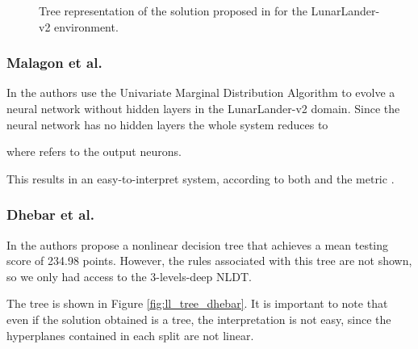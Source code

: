 \documentclass[review,english]{elsarticle}
\begin{document}
\begin{center}
\begin{figure}[!ht]
    \caption{Tree representation of the solution proposed in \cite{silva_optimization_2020} for the LunarLander-v2 environment.}
    \label{fig:ll_tree_silva}
    \end{figure}
\end{center}

\subsubsection{Malagon et al.}
In \cite{malagon_evolving_2019} the authors use the Univariate Marginal Distribution Algorithm to evolve a neural network without hidden layers in the LunarLander-v2 domain.
Since the neural network has no hidden layers the whole system reduces to 

where  refers to the output neurons.

This results in an easy-to-interpret system, according to both \cite{lipton_mythos_2017} and the metric .

\subsubsection{Dhebar et al.}
In \cite{dhebar_interpretable-ai_2020} the authors propose a nonlinear decision tree that achieves a mean testing score of 234.98 points. 
However, the rules associated with this tree are not shown, so we only had access to the 3-levels-deep NLDT.

The tree is shown in Figure \ref{fig:ll_tree_dhebar}.
It is important to note that even if the solution obtained is a tree, the interpretation is not easy, since the hyperplanes contained in each split are not linear.
\end{document}
